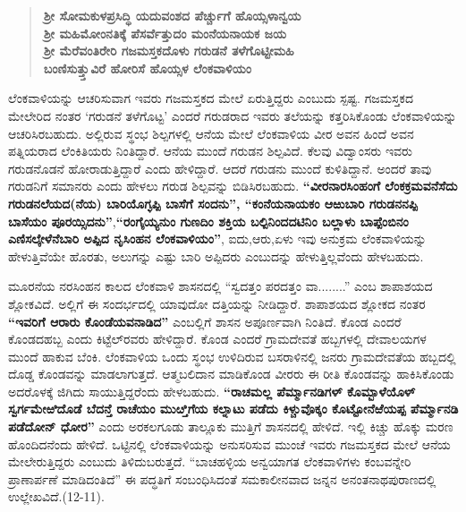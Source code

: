 \begin{verse}
\textbf{ಶ‍್ರೀ ಸೋಮಕುಳಪ್ರಸಿದ್ಧಿ ಯದುವಂಶದ ಪೆರ್ಚ್ಚುಗೆ ಹೊಯ್ಸಳಾನ್ವಯ} \\\textbf{ಶ‍್ರೀ ಮಹಿಮೋಂನತಿಕ್ಕೆ ಪೆಸರ್ವೆತ್ತುದಂ ಮಂನೆಯನಾಯಕ ಜಯ} \\\textbf{ಶ‍್ರೀ ಮೆರೆವಂತಿರೇರಿ ಗಜಮಸ್ತಕದೊಳು ಗರುಡನೆ ತಳೆಗೊಟ್ಟೀಮಹಿ} \\\textbf{ಬಂಣಿಸುತ್ತ್ತುವಿರೆ ಹೋರಿಸೆ ಹೊಯ್ಸಳ ಲೆಂಕವಾಳಿಯಂ}
\end{verse}

ಲೆಂಕವಾಳಿಯನ್ನು ಆಚರಿಸುವಾಗ ಇವರು ಗಜಮಸ್ತಕದ ಮೇಲೆ ಏರುತ್ತಿದ್ದರು ಎಂಬುದು ಸ್ಪಷ್ಟ. ಗಜಮಸ್ತಕದ ಮೇಲೇರಿದ ನಂತರ ‘ಗರುಡನೆ ತಳೆಗೊಟ್ಟ’ ಎಂದರೆ ಗರುಡರಾದ ಇವರು ತಲೆಯನ್ನು ಕತ್ತರಿಸಿಕೊಂಡು ಲೆಂಕವಾಳಿಯನ್ನು ಆಚರಿಸಿರಬಹುದು. ಅಲ್ಲಿರುವ ಸ್ಥಂಭ ಶಿಲ್ಪಗಳಲ್ಲಿ ಆನೆಯ ಮೇಲೆ ಲೆಂಕವಾಳಿಯ ವೀರ ಅವನ ಹಿಂದೆ ಅವನ ಪತ್ನಿಯರಾದ ಲೆಂಕಿತಿಯರು ನಿಂತಿದ್ದಾರೆ. ಆನೆಯ ಮುಂದೆ ಗರುಡನ ಶಿಲ್ಪವಿದೆ. ಕೆಲವು ವಿದ್ವಾಂಸರು ಇವರು ಗರುಡನೊಡನೆ ಹೋರಾಡುತ್ತಿದ್ದಾರೆ ಎಂದು ಹೇಳಿದ್ದಾರೆ. ಆದರೆ ಗರುಡನು ಮುಂದೆ ಕುಳಿತಿದ್ದಾನೆ. ಅಂದರೆ ತಾವು ಗರುಡನಿಗೆ ಸಮಾನರು ಎಂದು ಹೇಳಲು ಗರುಡ ಶಿಲ್ಪವನ್ನು ಬಿಡಿಸಿರಬಹುದು. \textbf{“ವೀರನಾರಸಿಂಹಂಗೆ ಲೆಂಕಕ್ರಮವನೆಸೆದು ಗರುಡನಲೆಯದ(ನೆಯ) ಬಾರಿಯೊಗ್ಳಪ್ಪಿ ಬಾಸೆಗೆ ಸಂದನು”, “ಕಂನೆಯನಾಯಕಂ ಆಱುಬಾರಿ ಗರುಡನನಪ್ಪಿ ಬಾಸೆಯಂ ಪೂರಯ್ಸಿದನು”},\textbf{“ರಂಗೈಯ್ಯನುಂ ಗುಣದಿಂ ಶಕ್ತಿಯ ಬಲ್ಪಿನಿಂದದಟಿನಿಂ ಬಲ್ಲಾಳು ಬಾಪ್ಪೆಂಬಿನಂ ಎಣಿಸಲ್ಕೇಳೆನೆಬಾರಿ ಅಪ್ಪಿದ ನೃಸಿಂಹನ ಲೆಂಕವಾಳಿಯಂ”}, ಐದು,ಆರು,ಏಳು ಇವು ಅನುಕ್ರಮ ಲೆಂಕವಾಳಿಯನ್ನು ಹೇಳುತ್ತಿವೆಯೇ ಹೊರತು, ಅಲುಗನ್ನು ಎಷ್ಟು ಬಾರಿ ಅಪ್ಪಿದರು ಎಂಬುದನ್ನು ಹೇಳುತ್ತಿಲ್ಲವೆಂದು ಹೇಳಬಹುದು.

ಮೂರನೆಯ ನರಸಿಂಹನ ಕಾಲದ ಲೆಂಕವಾಳಿ ಶಾಸನದಲ್ಲಿ “ಸ್ವದತ್ತಂ ಪರದತ್ತಂ ವಾ........” ಎಂಬ ಶಾಪಾಶಯದ ಶ್ಲೋಕವಿದೆ. ಅಲ್ಲಿಗೆ ಈ ಸಂದರ್ಭದಲ್ಲಿ ಯಾವುದೋ ದತ್ತಿಯನ್ನು ನೀಡಿದ್ದಾರೆ. ಶಾಪಾಶಯದ ಶ್ಲೋಕದ ನಂತರ \textbf{“ಇವರಿಗೆ ಆರಾರು ಕೊಂಡೆಯವನಾಡಿದ”} ಎಂಬಲ್ಲಿಗೆ ಶಾಸನ ಅಪೂರ್ಣವಾಗಿ ನಿಂತಿದೆ. ಕೊಂಡ ಎಂದರೆ ಕೊಂಡದಹಬ್ಬ ಎಂದು ಕಿಟ್ಟೆಲ್​ರವರು ಹೇಳಿದ್ದಾರೆ. ಕೊಂಡ ಎಂದರೆ ಗ್ರಾಮದೇವತೆ ಹಬ್ಬಗಳಲ್ಲಿ ದೇವಾಲಯಗಳ ಮುಂದೆ ಹಾಕುವ ಬೆಂಕಿ. ಲೆಂಕವಾಳಿಯ ಒಂದು ಸ್ಥಂಭ ಉಳಿದಿರುವ ಬಸರಾಳಿನಲ್ಲಿ ಜನರು ಗ್ರಾಮದೇವತೆಯ ಹಬ್ಬದಲ್ಲಿ ದೊಡ್ಡ ಕೊಂಡವನ್ನು ಮಾಡಲಾಗುತ್ತದೆ. ಆತ್ಮಬಲಿದಾನ ಮಾಡಿಕೊಂಡ ವೀರರು ಈ ರೀತಿ ಕೊಂಡವನ್ನು ಹಾಕಿಸಿಕೊಂಡು ಅದರೊಳಕ್ಕೆ ಜಿಗಿದು ಸಾಯುತ್ತಿದ್ದರೆಂದು ಹೇಳಬಹುದು. \textbf{“ರಾಚಮಲ್ಲ ಪೆರ್ಮ್ಮಾನಡಿಗಳ್​ ಕೊಮ್ಬಾಳೆಯೊಳ್​ ಸ್ವರ್ಗಮೇಱಿದೊಡೆ ಬೆದನ್ತೆ ರಾಚೆಯಂ ಮುೞ್ತಿಗೆಯ ಕಲ್ನಾಟು ಪಡೆದು ಕಿಳ್ಚುವೊಕ್ಕಂ ಕೊಟ್ಟೋನೆಱೆಯಪ್ಪ ಪೆರ್ಮ್ಮಾನಡಿ ಪಡೆದೋನ್​ ಧೋರ”} ಎಂದು ಅರಕಲಗೂಡು ತಾಲ್ಲೂಕು ಮುತ್ತಿಗೆ ಶಾಸನದಲ್ಲಿ ಹೇಳಿದೆ. ಇಲ್ಲಿ ಕಿಚ್ಚು ಹೊಕ್ಕು ಮರಣ ಹೊಂದಿದನೆಂದು ಹೇಳಿದೆ. ಒಟ್ಟಿನಲ್ಲಿ ಲೆಂಕವಾಳಿಯನ್ನು ಅನುಸರಿಸುವ ಮುಂಚೆ ಇವರು ಗಜಮಸ್ತಕದ ಮೇಲೆ ಆನೆಯ ಮೇಲೇರುತ್ತಿದ್ದರು ಎಂಬುದು ತಿಳಿದುಬರುತ್ತದೆ. “ಬಾಚಹಳ್ಳಿಯ ಅನ್ವಯಾಗತ ಲೆಂಕವಾಳಿಗಳು ಕಂಬವನ್ನೇರಿ ಪ್ರಾಣಾರ್ಪಣೆ ಮಾಡಿದಂತಿದೆ” ಈ ಪದ್ಧತಿಗೆ ಸಂಬಂಧಿಸಿದಂತೆ ಸಮಕಾಲೀನವಾದ ಜನ್ನನ ಅನಂತನಾಥಪುರಾಣದಲ್ಲಿ ಉಲ್ಲೇಖವಿದೆ.(12-11).

